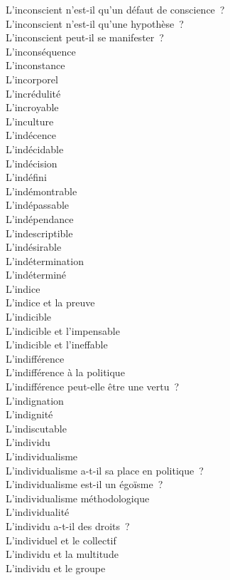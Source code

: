\documentclass[a4paper,12pt]{article}
\begin{document}
L'inconscient n'est-il qu'un défaut de conscience ? \\
L'inconscient n'est-il qu'une hypothèse ? \\
L'inconscient peut-il se manifester ? \\
L'inconséquence \\
L'inconstance \\
L'incorporel \\
L'incrédulité \\
L'incroyable \\
L'inculture \\
L'indécence \\
L'indécidable \\
L'indécision \\
L'indéfini \\
L'indémontrable \\
L'indépassable \\
L'indépendance \\
L'indescriptible \\
L'indésirable \\
L'indétermination \\
L'indéterminé \\
L'indice \\
L'indice et la preuve \\
L'indicible \\
L'indicible et l'impensable \\
L'indicible et l'ineffable \\
L'indifférence \\
L'indifférence à la politique \\
L'indifférence peut-elle être une vertu ? \\
L'indignation \\
L'indignité \\
L'indiscutable \\
L'individu \\
L'individualisme \\
L'individualisme a-t-il sa place en politique ? \\
L'individualisme est-il un égoïsme ? \\
L'individualisme méthodologique \\
L'individualité \\
L'individu a-t-il des droits ? \\
L'individuel et le collectif \\
L'individu et la multitude \\
L'individu et le groupe \\
\end{document}
